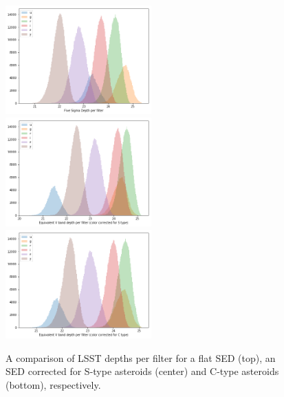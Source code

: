 \begin{figure}[tb!]
\begin{center}
\includegraphics[width=0.5\textwidth]{figs/5sig_filter.png}\\
\includegraphics[width=0.5\textwidth]{figs/5sig_filter_S.png}\\
\includegraphics[width=0.5\textwidth]{figs/5sig_filter_C.png}
\end{center}
\caption{A comparison of LSST depths per filter for a flat SED (top), an SED corrected for S-type asteroids (center) and C-type asteroids (bottom), respectively.}
\label{fig:sed}       %
\end{figure}
%
% 
\clearpage
